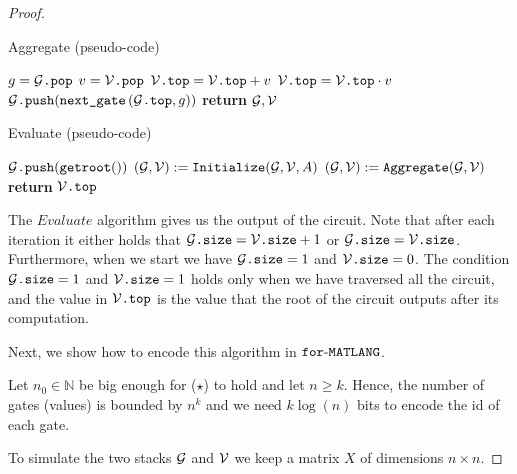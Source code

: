 \begin{proof}
    \begin{algorithm}
    \caption{Aggregate (pseudo-code)}\label{alg:agg_code}
    \begin{algorithmic}[1]
        \State $g = \mathcal{G}\texttt{.pop}$
        \State $v = \mathcal{V}\texttt{.pop}$
        \If{$\isplus{\gettop{\cG}}$}
            \State $\mathcal{V}\texttt{.top} = \mathcal{V}\texttt{.top} + v$
        \ElsIf{$\isprod{\gettop{\cG}}$}
            \State $\mathcal{V}\texttt{.top} = \mathcal{V}\texttt{.top} \cdot v$
        \EndIf
            \State $\mathcal{G}\texttt{.push}(\texttt{next{\_}gate}\left(\mathcal{G}\texttt{.top}, g \right))$
        \EndIf
        \State \textbf{return} $\mathcal{G}, \mathcal{V}$
    \EndFunction
    \end{algorithmic}
    \end{algorithm}

    \begin{algorithm}
    \caption{Evaluate (pseudo-code)}\label{alg:eval_code}
    \begin{algorithmic}[1]
        \State $\mathcal{G}\texttt{.push}(\texttt{getroot}())$
                \State $(\mathcal{G},\mathcal{V}) := \texttt{Initialize}(\mathcal{G},\mathcal{V},A)$
            \Else
                \State $(\mathcal{G},\mathcal{V}):= \texttt{Aggregate}(\mathcal{G},\mathcal{V})$
            \EndIf
        \EndWhile
        \State \textbf{return} $\mathcal{V}\texttt{.top}$
    \EndFunction
    \end{algorithmic}
    \end{algorithm}

    The $Evaluate$ algorithm gives us the output of the circuit. Note that after each iteration it either holds that $\mathcal{G}\texttt{.size} =  \mathcal{V}\texttt{.size} + 1$ or $\mathcal{G}\texttt{.size} =  \mathcal{V}\texttt{.size}$. Furthermore, when we start we have $\mathcal{G}\texttt{.size}=1$ and $\mathcal{V}\texttt{.size}=0$. The condition $\mathcal{G}\texttt{.size}= 1$ and $\mathcal{V}\texttt{.size}=1$ holds only when we have traversed all the circuit, and the value in $\mathcal{V}\texttt{.top}$ is the value that the root of the circuit outputs after its computation.

    Next, we show how to encode this algorithm in $\texttt{for}\text{-}\texttt{MATLANG}$.

    Let $n_0\in\mathbb{N}$ be big enough for ($\star$) to hold and let $n\geq k$. Hence, the number of gates (values) is bounded by $n^k$ and we need $k\log (n)$ bits to encode the id of each gate.

    To simulate the two stacks $\mathcal{G}$ and $\mathcal{V}$ we keep a matrix $X$ of dimensions $n \times n$.


\end{proof}
